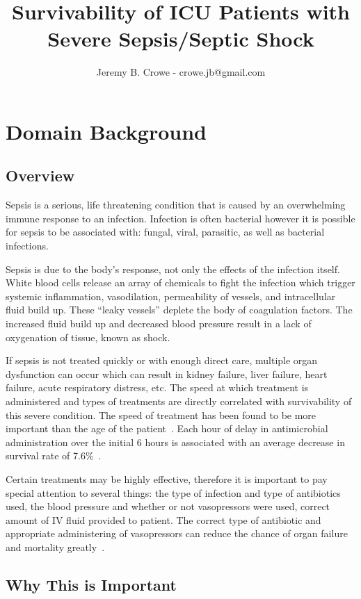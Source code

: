 \documentclass[11pt]{article}
\begin{document}
\title{Survivability of ICU Patients with Severe Sepsis/Septic Shock}
\author{Jeremy B. Crowe - crowe.jb@gmail.com}
\maketitle

\section{Domain Background}
\subsection{Overview}
Sepsis is a serious, life threatening condition that is caused by an overwhelming immune response to an infection. Infection is often bacterial however it is possible for sepsis to be associated with: fungal, viral, parasitic, as well as bacterial infections.

Sepsis is due to the body's response, not only the effects of the infection itself. White blood cells release an array of chemicals to fight the infection which trigger systemic inflammation, vasodilation, permeability of vessels, and intracellular fluid build up. These ``leaky vessels'' deplete the body of coagulation factors. The increased fluid build up and decreased blood pressure result in a lack of oxygenation of tissue, known as shock.

If sepsis is not treated quickly or with enough direct care, multiple organ dysfunction can occur which can result in kidney failure, liver failure, heart failure, acute respiratory distress, etc. The speed at which treatment is administered and types of treatments are directly correlated with survivability of this severe condition. The speed of treatment has been found to be more important than the age of the patient~\cite{survival2}. Each hour of delay in antimicrobial administration over the initial 6 hours is associated with an average decrease in survival rate of 7.6\%~\cite{survival}.

Certain treatments may be highly effective, therefore it is important to pay special attention to several things: the type of infection and type of antibiotics used, the blood pressure and whether or not vasopressors were used, correct amount of IV fluid provided to patient. The correct type of antibiotic and appropriate administering of vasopressors can reduce the chance of organ failure and mortality greatly~\cite{pressors}.

\subsection{Why This is Important}
\end{document}
